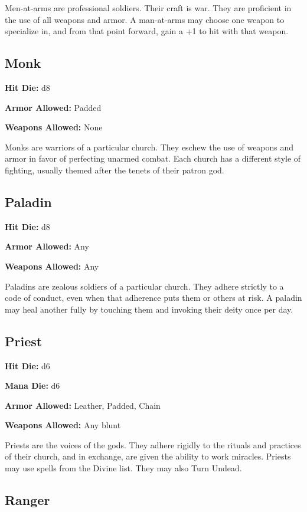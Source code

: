 \begin{multicols}{2}
Men-at-arms are professional soldiers. Their craft is war. They are proficient
in the use of all weapons and armor. A man-at-arms may choose one weapon to
specialize in, and from that point forward, gain a +1 to hit with that weapon.

\subsection{Monk}

\textbf{Hit Die:} d8

\textbf{Armor Allowed:} Padded

\textbf{Weapons Allowed:} None

Monks are warriors of a particular church. They eschew the use of weapons and
armor in favor of perfecting unarmed combat. Each church has a different style
of fighting, usually themed after the tenets of their patron god.

\subsection{Paladin}

\textbf{Hit Die:} d8

\textbf{Armor Allowed:} Any

\textbf{Weapons Allowed:} Any

Paladins are zealous soldiers of a particular church. They adhere strictly to
a code of conduct, even when that adherence puts them or others at risk. A
paladin may heal another fully by touching them and invoking their deity once per day.

\subsection{Priest}

\textbf{Hit Die:} d6

\textbf{Mana Die:} d6

\textbf{Armor Allowed:} Leather, Padded, Chain

\textbf{Weapons Allowed:} Any blunt

Priests are the voices of the gods. They adhere rigidly to the rituals and
practices of their church, and in exchange, are given the ability to work
miracles. Priests may use spells from the Divine list. They may also Turn
Undead.

\subsection{Ranger}


\end{multicols}
